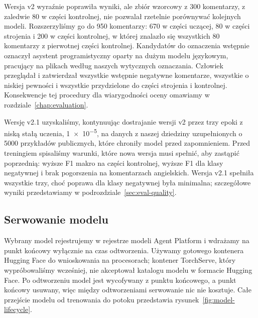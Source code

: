 Wersja v2 wyraźnie poprawiła wyniki, ale zbiór wzorcowy z 300 komentarzy, z zaledwie 80 w części kontrolnej, nie pozwalał rzetelnie porównywać kolejnych modeli.
Rozszerzyliśmy go do 950 komentarzy: 670 w części uczącej, 80 w części strojenia i 200 w części kontrolnej, w której znalazło się wszystkich 80 komentarzy z pierwotnej części kontrolnej.
Kandydatów do oznaczenia wstępnie oznaczył asystent programistyczny oparty na dużym modelu językowym, pracujący na plikach według naszych wytycznych oznaczania.
Człowiek przeglądał i zatwierdzał wszystkie wstępnie negatywne komentarze, wszystkie o niskiej pewności i wszystkie przydzielone do części strojenia i kontrolnej.
Konsekwencje tej procedury dla wiarygodności oceny omawiamy w rozdziale~\ref{chap:evaluation}.

Wersję v2.1 uzyskaliśmy, kontynuując dostrajanie wersji v2 przez trzy epoki z niską stałą uczenia, \num{1e-5}, na danych z naszej dziedziny uzupełnionych o \num{5000} przykładów publicznych, które chroniły model przed zapomnieniem.
Przed treningiem spisaliśmy warunki, które nowa wersja musi spełnić, aby zastąpić poprzednią: wyższe F1 makro na części kontrolnej, wyższe F1 dla klasy negatywnej i brak pogorszenia na komentarzach angielskich.
Wersja v2.1 spełniła wszystkie trzy, choć poprawa dla klasy negatywnej była minimalna; szczegółowe wyniki przedstawiamy w podrozdziale~\ref{sec:eval-quality}.

\subsection{Serwowanie modelu}
\label{sec:impl-serving}

Wybrany model rejestrujemy w rejestrze modeli Agent Platform i wdrażamy na punkt końcowy wyłącznie na czas odtworzenia.
Używamy gotowego kontenera Hugging Face do wnioskowania na procesorach; kontener TorchServe, który wypróbowaliśmy wcześniej, nie akceptował katalogu modelu w formacie Hugging Face.
Po odtworzeniu model jest wycofywany z punktu końcowego, a punkt końcowy usuwany, więc między odtworzeniami serwowanie nic nie kosztuje.
Całe przejście modelu od trenowania do potoku przedstawia rysunek~\ref{fig:model-lifecycle}.

